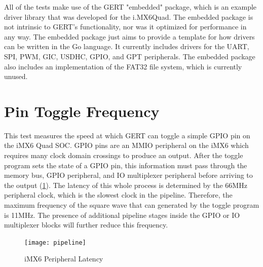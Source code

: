 All of the tests make use of the GERT "embedded" package, which is an example
driver library that was developed for the i.MX6Quad. The embedded package is not intrinsic to GERT's
functionality, nor was it optimized for performance in any way. The embedded package
just aims to provide a template for how drivers can be written in the Go language.
It currently includes drivers for the UART, SPI, PWM, GIC, USDHC, GPIO, and GPT peripherals.
The embedded package also includes an implementation of the FAT32 file system, which is
currently unused.


\section{Pin Toggle Frequency}\label{sec:pin_toggle}
This test measures the speed at which GERT can toggle a simple GPIO pin on
the iMX6 Quad SOC. GPIO pins are an MMIO peripheral on the iMX6 which requires
many clock domain crossings to produce an output. After the toggle program sets
the state of a GPIO pin, this information must pass through the memory bus,
GPIO peripheral, and IO multiplexer peripheral before arriving to the output (\ref{fig:pipeline}).
The latency of this whole process is determined by the 66MHz peripheral clock,
which is the slowest clock in the pipeline. Therefore, the maximum frequency
of the square wave that can generated by the toggle program is 11MHz. The presence
of additional pipeline stages inside the GPIO or IO multiplexer blocks will further
reduce this frequency.

\begin{figure}[h]
\begin{center}
  \texttt{[image: pipeline]}
\end{center}
  \caption{iMX6 Peripheral Latency} \label{fig:pipeline}
\end{figure}

